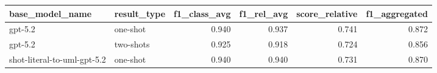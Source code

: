 \begin{tabular}{llrrrr}
\toprule
base_model_name & result_type & f1_class_avg & f1_rel_avg & score_relative & f1_aggregated \\
\midrule
gpt-5.2 & one-shot & 0.940 & 0.937 & 0.741 & 0.872 \\
gpt-5.2 & two-shots & 0.925 & 0.918 & 0.724 & 0.856 \\
shot-literal-to-uml-gpt-5.2 & one-shot & 0.940 & 0.940 & 0.731 & 0.870 \\
\bottomrule
\end{tabular}
